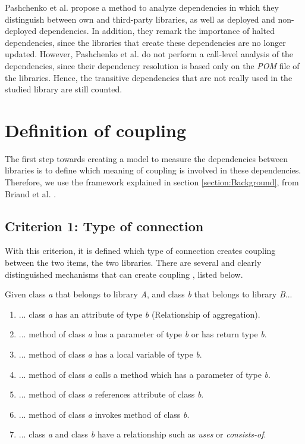 \documentclass[a4paper]{article}
\begin{document}
Pashchenko et al. \cite{pashchenko2018vulnerable} propose a method to analyze dependencies in which they distinguish between own and third-party libraries, as well as deployed and non-deployed dependencies. In addition, they remark the importance of halted dependencies, since the libraries that create these dependencies are no longer updated. However, Pashchenko et al. do not perform a call-level analysis of the dependencies, since their dependency resolution is based only on the \textit{POM} file of the libraries. Hence, the transitive dependencies that are not really used in the studied library are still counted.

\section{Definition of coupling}
The first step towards creating a model to measure the dependencies between libraries is to define which meaning of coupling is involved in these dependencies. Therefore, we use the framework explained in section \ref{section:Background}, from Briand et al. \cite{briand1999unified}.

\subsection{Criterion 1: Type of connection}
With this criterion, it is defined which type of connection creates coupling between the two items, the two libraries. There are several and clearly distinguished mechanisms that can create coupling \cite{briand1999unified}, listed below.

Given class \textit{a} that belongs to library \textit{A}, and class \textit{b} that belongs to library \textit{B}...

\begin{enumerate}[noitemsep,leftmargin=*]
  \item ... class \textit{a} has an attribute of type \textit{b} (Relationship of aggregation).
  \item ... method of class \textit{a} has a parameter of type \textit{b} or has return type \textit{b}.
  \item ... method of class \textit{a} has a local variable of type \textit{b}.
  \item ... method of class \textit{a} calls a method which has a parameter of type \textit{b}.
  \item ... method of class \textit{a} references attribute of class \textit{b}.
  \item ... method of class \textit{a} invokes method of class \textit{b}.
  \item ... class \textit{a} and class \textit{b} have a relationship such as \textit{uses} or \textit{consists-of}.
\end{enumerate}
\end{document}
